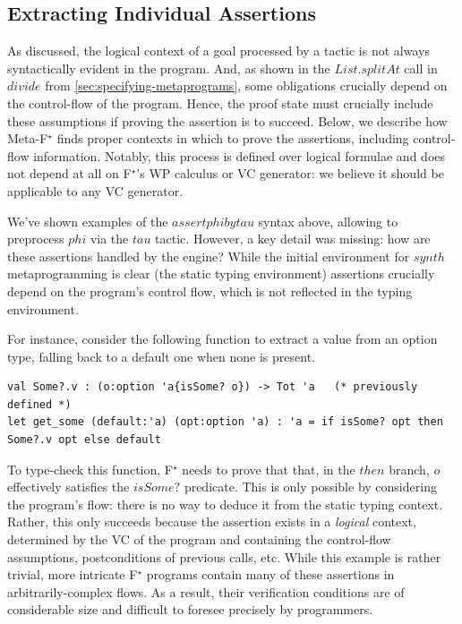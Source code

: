 \documentclass[runningheads]{llncs}
\newcommand\fstar{F$^\star$\xspace}
\newcommand\metafstar{Meta-F$^\star$\xspace}
\newcommand{\comm}[3]{\ifcheckpagebudget\else\ifdraft{{\color{#1}[#2: #3]}}\fi\fi}
\newcommand{\nik}[1]{\comm{dkpurple}{Nik}{#1}}
\newcommand{\ch}[1]{\comm{teal}{CH}{#1}}
\newcommand{\guido}[1]{\comm{blue}{Guido}{#1}}
\newcommand{\da}[1]{\comm{dkyellow}{Danel}{#1}}
\begin{document}

\subsection{Extracting Individual Assertions}
\label{sec:vcgen}

As discussed, the logical context of a goal processed by a
tactic is not always syntactically evident in the program.
%
And, as shown in the \ls$List.splitAt$ call in \ls$divide$ from
\autoref{sec:specifying-metaprograms}, some
obligations crucially depend on the control-flow of the program.
%
Hence, the proof state must crucially include these assumptions
if proving the assertion is to succeed.
%
Below, we describe how \metafstar finds proper contexts in which
to prove the assertions, including control-flow information.
%
Notably, this process is defined over logical formulae and does not
depend at all on \fstar's WP calculus or VC generator: we believe it
should be applicable to any VC generator.


\iffalse
We've shown examples of the \ls$assert phi by tau$ syntax above,
allowing to preprocess \ls$phi$ via the \ls$tau$ tactic.
%
However, a key detail was missing: how are these assertions
handled by the engine?
%
While the initial environment for \ls$synth$ metaprogramming is
clear (the static typing environment) assertions crucially depend
on the program's control flow, which is not reflected in the typing
environment.

For instance, consider the following function to extract a value
from an option type, falling back to a default one when none
is present.
\begin{lstlisting}
val Some?.v : (o:option 'a{isSome? o}) -> Tot 'a   (* previously defined *)
let get_some (default:'a) (opt:option 'a) : 'a = if isSome? opt then Some?.v opt else default
\end{lstlisting}
To type-check this function, \fstar needs to prove that that, in the
\ls$then$ branch, \ls$o$ effectively satisfies the \ls$isSome?$
predicate.
%
This is only possible by considering the program's flow:
there is no way to deduce it from the static typing context.
%
Rather, this only succeeds because the assertion exists in a
\emph{logical} context, determined by the VC of the program and
containing the control-flow assumptions, postconditions of previous
calls, etc.
%
While this example is rather trivial, more intricate \fstar programs
contain many of these assertions in arbitrarily-complex flows.
%
As a result, their verification conditions are of considerable size and
difficult to foresee precisely by programmers.
\end{document}
